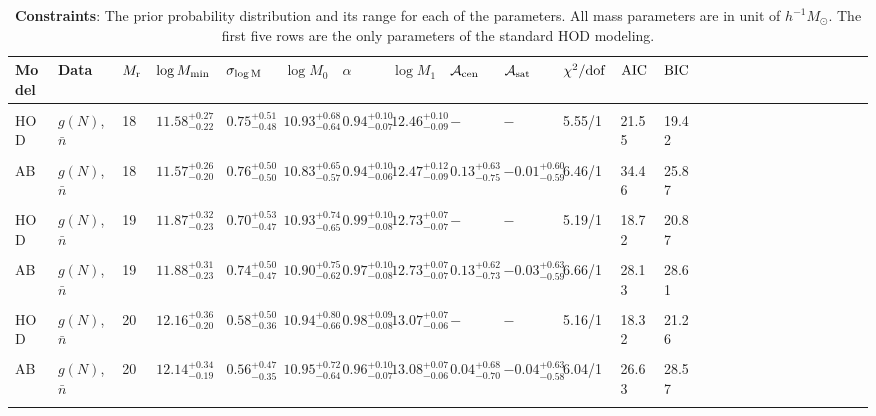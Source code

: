 \documentclass[12pt, preprint]{emulateapj}
\newcommand{\gmf}{g(N)}
\newcommand{\mr}{M_{\rm r}}
\newcommand{\mzero}{\log M_{0}}
\newcommand{\mone}{\log M_{1}}
\newcommand{\mmin}{\log M_{\rm min}}
\newcommand{\sigmam}{\sigma_{\log \rm M}}
\newcommand{\acen}{\mathcal{A}_{\rm cen}}
\newcommand{\asat}{\mathcal{A}_{\rm sat}}
\begin{document}
\begin{table*}
\begin{center}
  \label{tab:prior}
  \caption{{\bf Constraints}: The prior probability distribution 
  and its range for each of the parameters. 
  All mass parameters are in unit of $h^{-1}M_\odot$. The first five rows are the only parameters of the standard HOD modeling.}
\begin{tabular}{@{}lllllllllllllllllllllllll}
\\ \hline 
    Model & Data & $\mr$ & $\mmin$ & $\sigmam$ & $\mzero$ & $\alpha$ &  $\mone$ & $\acen$ & $\asat$ & $\chi^{2}/\rm{dof}$ & $\rm{AIC}$ & $\rm{BIC}$\\  \hline
  \\
  HOD & $\gmf$, $\bar{n}$ & 18 & $11.58^{+0.27}_{-0.22}$ &  $0.75^{+0.51}_{-0.48}$ & $10.93^{+0.68}_{-0.64}$ & $0.94^{+0.10}_{-0.07}$ &  $12.46^{+0.10}_{-0.09}$ & $-$ & $-$ & 5.55/1 & 21.55 & 19.42\\ \\
  
  AB & $\gmf$, $\bar{n}$ & 18 & $11.57^{+0.26}_{-0.20}$ &  $0.76^{+0.50}_{-0.50}$ & $10.83^{+0.65}_{-0.57}$ & $0.94^{+0.10}_{-0.06}$ &  $12.47^{+0.12}_{-0.09}$ & $0.13^{+0.63}_{-0.75}$ & $-0.01^{+0.60}_{-0.59}$ & 6.46/1 & 34.46 & 25.87\\ \\
   
HOD & $\gmf$, $\bar{n}$ & 19 & $11.87^{+0.32}_{-0.23}$ &  $0.70^{+0.53}_{-0.47}$ & $10.93^{+0.74}_{-0.65}$ & $0.99^{+0.10}_{-0.08}$ &  $12.73^{+0.07}_{-0.07}$ & $-$ & $-$ & 5.19/1 & 18.72 & 20.87\\ \\
    
AB & $\gmf$, $\bar{n}$ & 19 & $11.88^{+0.31}_{-0.23}$ &  $0.74^{+0.50}_{-0.47}$ & $10.90^{+0.75}_{-0.62}$ & $0.97^{+0.10}_{-0.08}$ &  $12.73^{+0.07}_{-0.07}$ & $0.13^{+0.62}_{-0.73}$ & $-0.03^{+0.63}_{-0.59}$ & 6.66/1 & 28.13 & 28.61\\ \\

HOD  & $\gmf$, $\bar{n}$ & 20 & $12.16^{+0.36}_{-0.20}$ &  $0.58^{+0.50}_{-0.36}$ & $10.94^{+0.80}_{-0.66}$ & $0.98^{+0.09}_{-0.08}$ &  $13.07^{+0.07}_{-0.06}$ & $-$ & $-$ & 5.16/1 & 18.32 & 21.26\\ \\

AB  & $\gmf$, $\bar{n}$ & 20 & $12.14^{+0.34}_{-0.19}$ &  $0.56^{+0.47}_{-0.35}$ & $10.95^{+0.72}_{-0.64}$ & $0.96^{+0.10}_{-0.07}$ &  $13.08^{+0.07}_{-0.06}$ & $0.04^{+0.68}_{-0.70}$ & $-0.04^{+0.63}_{-0.58}$ & 6.04/1 & 26.63 & 28.57\\ \\


\end{tabular}
\end{center}
\end{table*}
\end{document}
